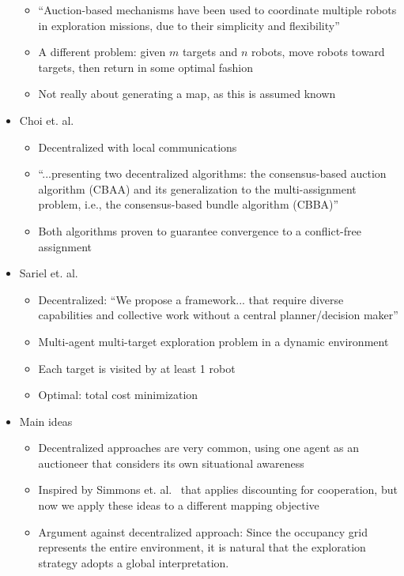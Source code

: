\documentclass[conference]{IEEEURAI}
\begin{document}
\begin{itemize}
\begin{itemize}
		\item ``Auction-based mechanisms have been used to coordinate multiple robots in exploration missions, due to their simplicity and flexibility''
		\item A different problem: given $m$ targets and $n$ robots, move robots toward targets, then return in some optimal fashion
		\item Not really about generating a map, as this is assumed known
	\end{itemize}
	\item Choi et. al.~\cite{ChoBruHow09}
	\begin{itemize}
		\item Decentralized with local communications
		\item ``...presenting two decentralized algorithms: the consensus-based auction algorithm (CBAA) and its generalization to the multi-assignment problem, i.e., the consensus-based bundle algorithm (CBBA)''
		\item Both algorithms proven to guarantee convergence to a conflict-free assignment
	\end{itemize}
	\item Sariel et. al.~\cite{SarBal05,SarBal06}
	\begin{itemize}
		\item Decentralized: ``We propose a framework... that require diverse capabilities and collective work without a central planner/decision maker''
		\item Multi-agent multi-target exploration problem in a dynamic environment
		\item Each target is visited by at least 1 robot
		\item Optimal: total cost minimization
	\end{itemize}
	\item Main ideas
	\begin{itemize}
		\item Decentralized approaches are very common, using one agent as an auctioneer that considers its own situational awareness
		\item Inspired by Simmons et. al.~\cite{SimApfBurFoxMooThrYou00} that applies discounting for cooperation, but now we apply these ideas to a different mapping objective
		\item Argument against decentralized approach: Since the occupancy grid represents the entire environment, it is natural that the exploration strategy adopts a global interpretation.
	\end{itemize}
\end{itemize}
\end{document}
